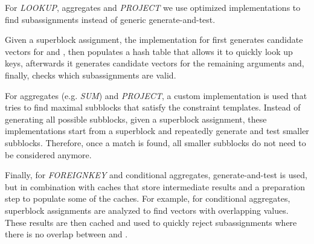 For \textit{LOOKUP}, aggregates and \textit{PROJECT} we use optimized implementations to find subassignments instead of generic generate-and-test.

Given a superblock assignment, the implementation for  first generates candidate vectors for  and , then populates a hash table that allows it to quickly look up keys, afterwards it generates candidate vectors for the remaining arguments and, finally, checks which subassignments are valid.

For aggregates (e.g. \textit{SUM}) and \textit{PROJECT}, a custom implementation is used that tries to find maximal subblocks that satisfy the constraint templates.
Instead of generating all possible subblocks, given a superblock assignment, these implementations start from a superblock and repeatedly generate and test smaller subblocks.
Therefore, once a match is found, all smaller subblocks do not need to be considered anymore.

Finally, for \textit{FOREIGNKEY} and conditional aggregates, generate-and-test is used, but in combination with caches that store intermediate results and a preparation step to populate some of the caches.
For example, for conditional aggregates, superblock assignments are analyzed to find vectors with overlapping values.
These results are then cached and used to quickly reject subassignments where there is no overlap between  and .




